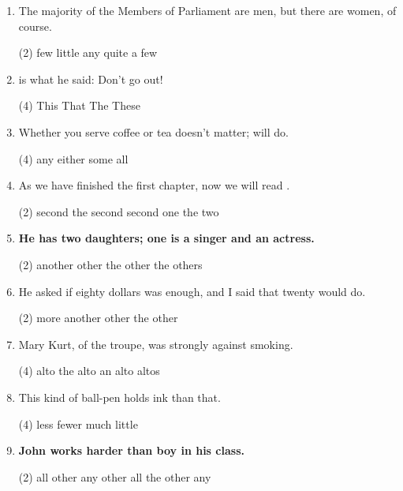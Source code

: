 \begin{enumerate}
\item The majority of the Members of Parliament are men, but there are  \ttu  women, of course.
  \begin{tasks}(2)
    \task few
    \task little
    \task any
    \task quite a few
  \end{tasks}

\item  \ttu  is what he said: Don't go out!
  \begin{tasks}(4)
    \task This
    \task That
    \task The
    \task These
  \end{tasks}

\item Whether you serve coffee or tea doesn't matter;  \ttu  will do.
  \begin{tasks}(4)
    \task any \task either \task some \task all
  \end{tasks}


\item As we have finished the first chapter, now we will read  \ttu .
  \begin{tasks}(2)
    \task second \task the second \task second one \task the two
  \end{tasks}

\item \textbf{He has two daughters; one is a singer and \ttu  an actress.}
  \begin{tasks}(2)
    \task another \task other
    \task the other \task the others
  \end{tasks}

\item He asked if eighty dollars was enough, and I said that  \ttu twenty would
  do.
  \begin{tasks}(2)
    \task more \task another \task other \task the other
  \end{tasks}

\item Mary Kurt, \ttu  of the troupe, was strongly against smoking.
  \begin{tasks}(4)
    \task alto \task the alto \task an alto \task altos
  \end{tasks}

\item This kind of ball-pen holds  \ttu ink than that.
  \begin{tasks}(4)
    \task less \task fewer \task much \task little
  \end{tasks}

\item \textbf{John works harder than  \ttu boy in his class.}
  \begin{tasks}(2)
    \task all other \task any other \task all the other \task any
  \end{tasks}


\end{enumerate}
